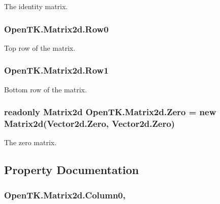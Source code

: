 The identity matrix. 

\hypertarget{struct_open_t_k_1_1_matrix2d_a49b4bbe9f2777d5cf0936d572c6c3ede}{
\subsubsection[{Row0}]{ Open\-T\-K.\-Matrix2d.\-Row0}}\label{struct_open_t_k_1_1_matrix2d_a49b4bbe9f2777d5cf0936d572c6c3ede}


Top row of the matrix. 

\hypertarget{struct_open_t_k_1_1_matrix2d_a95e4daf2860fcb733a5789f59e9e6219}{
\subsubsection[{Row1}]{ Open\-T\-K.\-Matrix2d.\-Row1}}\label{struct_open_t_k_1_1_matrix2d_a95e4daf2860fcb733a5789f59e9e6219}


Bottom row of the matrix. 

\hypertarget{struct_open_t_k_1_1_matrix2d_abf0d56b0756f09a523e82c033247865c}{
\subsubsection[{Zero}]{\setlength{\rightskip}{0pt plus 5cm}readonly {\bf Matrix2d} Open\-T\-K.\-Matrix2d.\-Zero = new {\bf Matrix2d}(Vector2d.\-Zero, Vector2d.\-Zero)\hspace{0.3cm}{\ttfamily [static]}}}\label{struct_open_t_k_1_1_matrix2d_abf0d56b0756f09a523e82c033247865c}


The zero matrix. 



\subsection{Property Documentation}
\hypertarget{struct_open_t_k_1_1_matrix2d_a557683389b82aa5fc6fc935c0ec3279d}{
\subsubsection[{Column0}]{ Open\-T\-K.\-Matrix2d.\-Column0\hspace{0.3cm}{\ttfamily [get]}, {\ttfamily [set]}}}\label{struct_open_t_k_1_1_matrix2d_a557683389b82aa5fc6fc935c0ec3279d}


